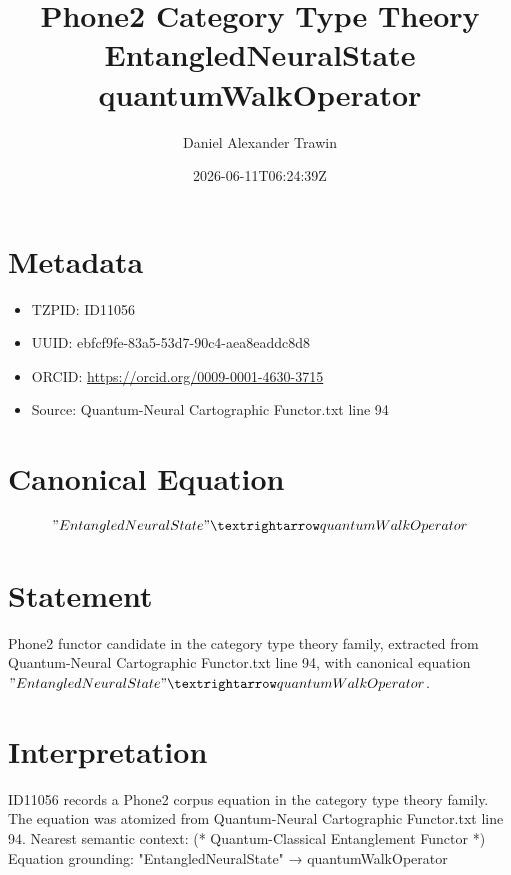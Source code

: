 \documentclass[11pt]{article}
\title{Phone2 Category Type Theory EntangledNeuralState quantumWalkOperator}
\author{Daniel Alexander Trawin}
\date{2026-06-11T06:24:39Z}
\begin{document}
\maketitle
\section*{Metadata}
\begin{itemize}
\item TZPID: ID11056
\item UUID: ebfcf9fe-83a5-53d7-90c4-aea8eaddc8d8
\item ORCID: \url{https://orcid.org/0009-0001-4630-3715}
\item Source: Quantum-Neural Cartographic Functor.txt line 94
\end{itemize}
\section*{Canonical Equation}
\[
"EntangledNeuralState" → quantumWalkOperator
\]
\section*{Statement}
Phone2 functor candidate in the category type theory family, extracted from Quantum-Neural Cartographic Functor.txt line 94, with canonical equation $"EntangledNeuralState" → quantumWalkOperator$.
\section*{Interpretation}
ID11056 records a Phone2 corpus equation in the category type theory family. The equation was atomized from Quantum-Neural Cartographic Functor.txt line 94. Nearest semantic context: (* Quantum-Classical Entanglement Functor *) Equation grounding: "EntangledNeuralState" → quantumWalkOperator
\end{document}
